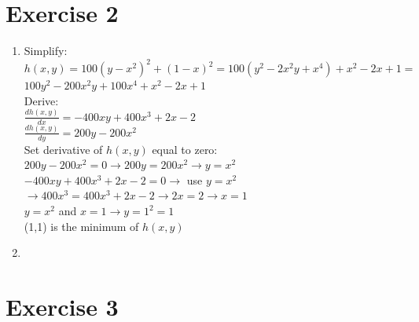 \documentclass[a4paper,11pt]{article}
\theoremstyle{mytheor}
\begin{document}
\section*{Exercise 2}
\begin{enumerate}
\item Simplify:\\
$h(x,y) = 100(y - x^2)^2 + (1 - x)^2 = 100(y^2 - 2x^2y + x^4) + x^2 - 2x + 1 =$ \\
$100y^2 - 200x^2y + 100x^4 + x^2 - 2x + 1$\\
\vspace{0.4cm}
Derive:\\
$\frac{dh(x,y)}{dx} = - 400xy + 400x^3 + 2x - 2$\\
$\frac{dh(x,y)}{dy} = 200y - 200x^2$\\
\vspace{0.4cm}
Set derivative of $h(x,y)$ equal to zero:\\
$200y - 200x^2 = 0 \rightarrow 200y = 200x^2 \rightarrow y = x^2$\\
$- 400xy + 400x^3 + 2x - 2 = 0 \rightarrow$ use $y = x^2$ $\rightarrow 400x^3 = 400x^3 + 2x - 2 \rightarrow 2x = 2 \rightarrow x = 1$\\
$y = x^2$ and $x = 1 \rightarrow y = 1^2 = 1$\\
(1,1) is the minimum of $h(x,y)$
\item
\end{enumerate}

\section*{Exercise 3}
\end{document}
